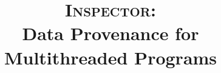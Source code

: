 \documentclass{IEEEtran}
\newcommand{\projecttitle}{\textsc{Inspector}\xspace}
\begin{document}

\author{
}
\title{\projecttitle:\\ Data Provenance for Multithreaded Programs}
\maketitle




%










 
\end{document}
